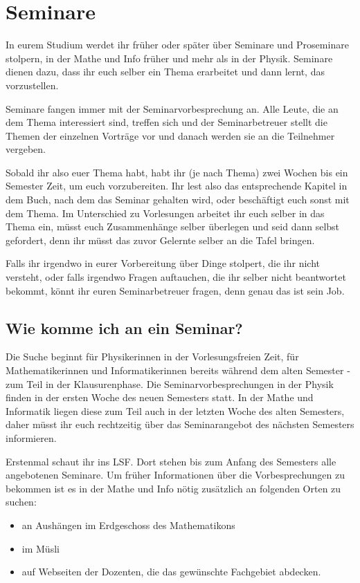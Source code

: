 \section{Seminare}

In eurem Studium werdet ihr früher oder später über Seminare und Proseminare stolpern, in der Mathe und Info früher und mehr als in der Physik. Seminare dienen dazu, dass ihr euch selber ein Thema erarbeitet und dann lernt,
das vorzustellen.

Seminare fangen immer mit der Seminarvorbesprechung an. Alle Leute, die an dem Thema interessiert sind, treffen sich und der Seminarbetreuer stellt die Themen der einzelnen Vorträge vor und danach werden sie an die Teilnehmer vergeben.

Sobald ihr also euer Thema habt, habt ihr (je nach Thema) zwei Wochen bis ein Semester Zeit, um euch vorzubereiten. Ihr lest also das entsprechende Kapitel in dem Buch, nach dem das Seminar gehalten wird, oder beschäftigt euch sonst mit dem Thema. Im Unterschied zu Vorlesungen arbeitet ihr euch selber in das Thema ein, müsst euch Zusammenhänge selber überlegen und seid dann selbst gefordert, denn ihr müsst das zuvor Gelernte selber an die Tafel bringen.

Falls ihr irgendwo in eurer Vorbereitung über Dinge stolpert, die ihr nicht versteht, oder falls irgendwo Fragen auftauchen, die ihr selber nicht beantwortet bekommt, könnt ihr euren Seminarbetreuer fragen, denn genau das ist sein Job.

\subsection{Wie komme ich an ein Seminar?}

Die Suche beginnt für Physikerinnen in der Vorlesungsfreien Zeit, für Mathematikerinnen und Informatikerinnen bereits während dem alten Semester \-- zum Teil in der Klausurenphase. Die Seminarvorbesprechungen in der Physik finden in der ersten Woche des neuen Semesters statt. In der Mathe und Informatik liegen diese zum Teil auch in der letzten Woche des alten Semesters, daher müsst ihr euch rechtzeitig über das Seminarangebot des nächsten Semesters informieren.

Erstenmal schaut ihr ins LSF. Dort stehen bis zum Anfang des Semesters alle angebotenen Seminare. Um früher Informationen über die Vorbesprechungen zu bekommen ist es in der Mathe und Info nötig zusätzlich an folgenden Orten zu suchen:

\begin{itemize}
	\item an Aushängen im Erdgeschoss des Mathematikons
	\item im Müsli
	\item auf Webseiten der Dozenten, die das gewünschte Fachgebiet abdecken.
\end{itemize}

